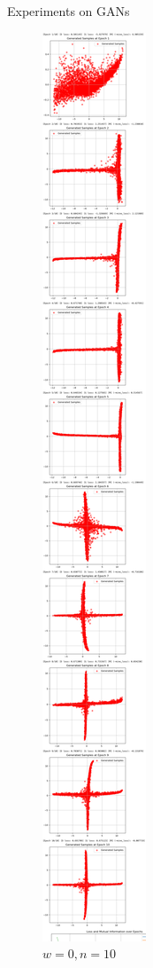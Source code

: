 \documentclass[final]{beamer}
\newlength{\colwidth}
\begin{document}
\begin{frame}[t]
\begin{columns}[t]
\begin{column}{\colwidth}
\begin{block}{Experiments on GANs}
\begin{figure}
\begin{minipage}{0.19\textwidth}
    \caption{$w=0,n=10$}
    \end{minipage}
    \begin{minipage}{0.19\textwidth}
    \centering
    \includegraphics[width=1\linewidth]{gan_cross/n=10/Jietu20250101-161610@2x.png}

\end{minipage}
\end{figure}
\end{block}
\end{column}
\end{columns}
\end{frame}
\end{document}
